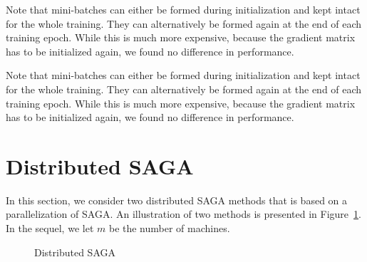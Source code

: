 \documentclass[a4paper,11pt]{article}
\begin{document}
Note that mini-batches can either be formed during initialization and kept
intact for the whole training. They can alternatively be formed again at the end
of each training epoch. While this is much more expensive, because the gradient
matrix has to be initialized again, we found no difference in performance.

Note that mini-batches can either be formed during initialization and kept
intact for the whole training. They can alternatively be formed again at the end
of each training epoch. While this is much more expensive, because the gradient
matrix has to be initialized again, we found no difference in performance.

%

\section{Distributed SAGA}

In this section, we consider two distributed SAGA methods that is based on a parallelization of SAGA. An illustration of two methods is presented in Figure~\ref{2figs-show}. In the sequel, we let $m$ be the number of machines.

\begin{figure} [h]
	\centering
	 \hspace{0pt}
	\caption{Distributed SAGA}
	\label{2figs-show}
\end{figure}
\end{document}
